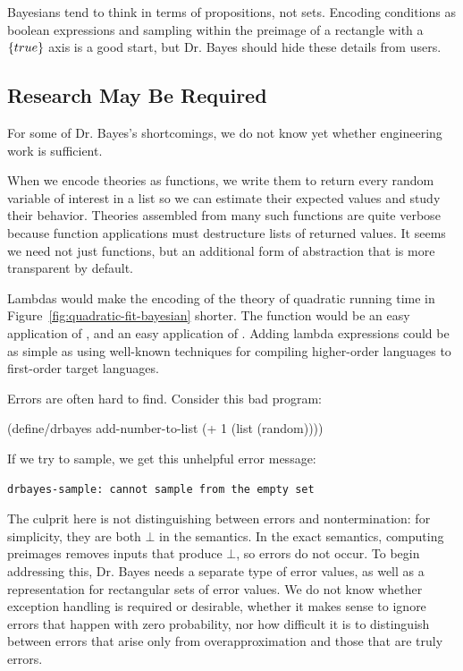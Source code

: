 Bayesians tend to think in terms of propositions, not sets.
Encoding conditions as boolean expressions and sampling within the preimage of a rectangle with a $\{{true}\}$ axis is a good start, but Dr. Bayes should hide these details from users.

\subsection{Research May Be Required}

For some of Dr. Bayes's shortcomings, we do not know yet whether engineering work is sufficient.

When we encode theories as functions, we write them to return every random variable of interest in a list so we can estimate their expected values and study their behavior.
Theories assembled from many such functions are quite verbose because function applications must destructure lists of returned values.
It seems we need not just functions, but an additional form of abstraction that is more transparent by default.

Lambdas would make the encoding of the theory of quadratic running time in Figure~\ref{fig:quadratic-fit-bayesian} shorter.
The  function would be an easy application of , and  an easy application of .
Adding lambda expressions could be as simple as using well-known techniques for compiling higher-order languages to first-order target languages.

Errors are often hard to find.
Consider this bad program:
\begin{center}\singlespacing
\begin{schemedisplay}
(define/drbayes add-number-to-list
  (+ 1 (list (random))))
\end{schemedisplay}
\end{center}
If we try to sample, we get this unhelpful error message:
\begin{center}\singlespacing
\texttt{drbayes-sample: cannot sample from the empty set}
\end{center}
The culprit here is not distinguishing between errors and nontermination: for simplicity, they are both $\bot$ in the semantics.
In the exact semantics, computing preimages removes inputs that produce $\bot$, so errors do not occur.
To begin addressing this, Dr. Bayes needs a separate type of error values, as well as a representation for rectangular sets of error values.
We do not know whether exception handling is required or desirable, whether it makes sense to ignore errors that happen with zero probability, nor how difficult it is to distinguish between errors that arise only from overapproximation and those that are truly errors.

